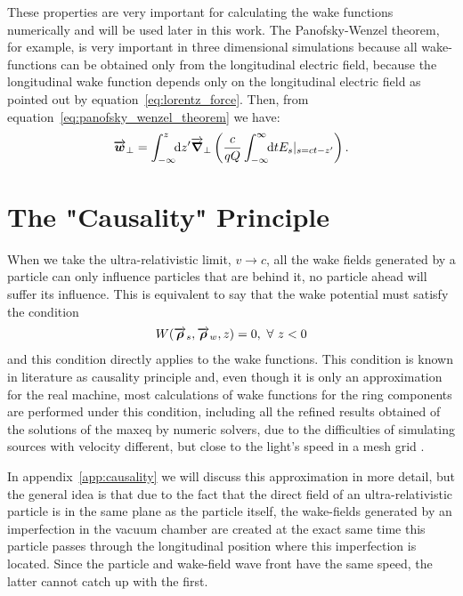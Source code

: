     These properties are very important for calculating the wake functions numerically and will be used later in this work. The Panofsky-Wenzel theorem, for example, is very important in three dimensional simulations because all wake-functions can be obtained only from the longitudinal electric field, because the longitudinal wake function depends only on the longitudinal electric field as pointed out by equation~\eqref{eq:lorentz_force}. Then, from equation~\eqref{eq:panofsky_wenzel_theorem} we have:
    \begin{align}
  	  	\vect{w}_\perp = \defint{z'}{\vect{\nabla}_\perp\left(\frac{c}{qQ}\infint{t}{E_s|_{s=ct-z'}}\right)}{-\infty}{z}.
    \end{align}

\section{The "Causality" Principle}

    When we take the ultra-relativistic limit, $v \to c$, all the wake fields generated by a particle can only influence particles that are behind it, no particle ahead will suffer its influence. This is equivalent to say that the wake potential must satisfy the condition
    \begin{align}
  	  	W(\vect{\rho}_s, \vect{\rho}_w, z) = 0, \,\,  \forall\,\, z < 0
    \end{align}
    and this condition directly applies to the wake functions. This condition is known in literature as causality principle and, even though it is only an approximation for the real machine, most calculations of wake functions for the ring components are performed under this condition, including all the refined results obtained of the solutions of the \gls{maxeq} by numeric solvers, due to the difficulties of simulating sources with velocity different, but close to the light's speed in a mesh grid \cite{MagazineImp}.

    In appendix~\ref{app:causality} we will discuss this approximation in more detail, but the general idea is that due to the fact that the direct field of an ultra-relativistic particle is in the same plane as the particle itself, the wake-fields generated by an imperfection in the vacuum chamber are created at the exact same time this particle passes through the longitudinal position where this imperfection is located. Since the particle and wake-field wave front have the same speed, the latter cannot catch up with the first.

